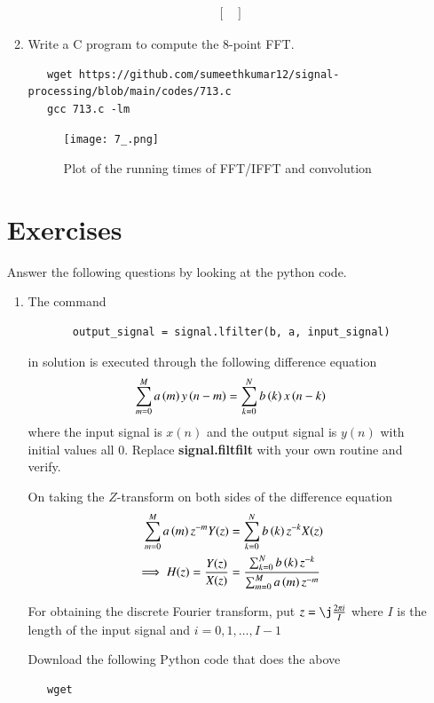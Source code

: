 \documentclass[journal,12pt,twocolumn]{IEEEtran}
\renewcommand\thesection{\arabic{section}}
\begin{document}
\begin{enumerate}[label=\thesection.\arabic*]
\begin{enumerate}[label=\arabic*.,ref=\thesection.\theenumi]
\begin{align}
\begin{bmatrix}
       \end{bmatrix}
     \end{align}
     \item Write a C program to compute the 8-point FFT.
     \solution \begin{lstlisting} 
   wget https://github.com/sumeethkumar12/signal-processing/blob/main/codes/713.c
   gcc 713.c -lm
     \end{lstlisting}
   \begin{figure}[!ht]
     \centering
     \texttt{[image: 7\_.png]}
     \caption{Plot of the running times of FFT/IFFT and convolution}
     \label{fig-7_14}	
   \end{figure}
   \end{enumerate}
   \section{Exercises}
   Answer the following questions by looking at the python code.
   \begin{enumerate}[label=\thesection.\arabic*]
     \item The command
     \begin{lstlisting}
       output_signal = signal.lfilter(b, a, input_signal)
     \end{lstlisting}
     in solution is executed through the following difference equation
     \begin{equation}
       \label{eq:iir_filter_gen}
       \sum _{m=0}^{M}a\left(m\right)y\left(n-m\right)=\sum _{k=0}^{N}b\left(k\right)x\left(n-k\right)
     \end{equation}
     where the input signal is $x(n)$ and the output signal is $y(n)$ with initial values all 0. Replace \textbf{signal.filtfilt} with your own routine and verify.
     
     \solution On taking the $Z$-transform on both sides of the difference equation
     \begin{align}
       \sum _{m=0}^{M}a\left(m\right) z^{-m} Y(z) &= \sum _{k=0}^{N}b\left(k\right) z^{-k} X(z) \\
       \implies H(z) = \frac{Y(z)}{X(z)} &= \frac{\sum _{k=0}^{N}b\left(k\right) z^{-k}}{\sum _{m=0}^{M}a\left(m\right) z^{-m}}
     \end{align}
     
     For obtaining the discrete Fourier transform, put $z = \j \frac{2\pi i}{I}$ where $I$ is the length of the input signal and $i = 0, 1, \ldots, I-1$
     
     Download the following Python code that does the above
     \begin{lstlisting}
   wget 
     \end{lstlisting}
     

\end{enumerate}
\end{enumerate}
\end{document}
